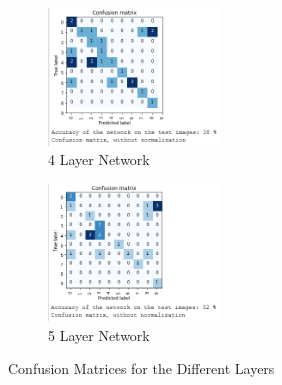 \documentclass{report}
\begin{document}
\begin{figure}[h!]
\begin{subfigure}[t]{0.45\textwidth}
            \includegraphics[width=0.5\textwidth]{4_layers}
            \caption{4 Layer Network}
        \end{subfigure}
        \begin{subfigure}[t]{0.45\textwidth}
            \centering
            \includegraphics[width=0.5\textwidth]{5_layers}
            \caption{5 Layer Network}
        \end{subfigure}
        \caption{Confusion Matrices for the Different Layers}
    \end{figure}
\end{document}

